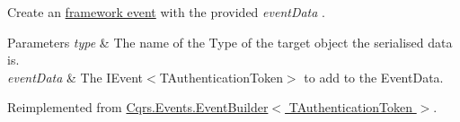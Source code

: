Create an \hyperlink{}{framework event} with the provided {\itshape event\+Data} . 


\begin{DoxyParams}{Parameters}
{\em type} & The name of the Type of the target object the serialised data is.\\
\hline
{\em event\+Data} & The I\+Event$<$\+T\+Authentication\+Token$>$ to add to the Event\+Data.\\
\hline
\end{DoxyParams}


Reimplemented from \hyperlink{classCqrs_1_1Events_1_1EventBuilder_aa6a794ef27f2795802a4390fd16535f6_aa6a794ef27f2795802a4390fd16535f6}{Cqrs.\+Events.\+Event\+Builder$<$ T\+Authentication\+Token $>$}.

